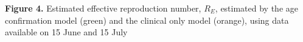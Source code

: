 \textbf{Figure 4.} Estimated effective reproduction number, $R_E$, estimated by the age confirmation model (green) and the clinical only model (orange), using data available on 15 June and 15 July